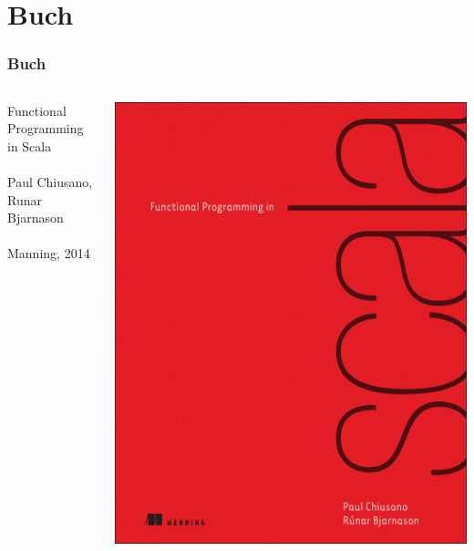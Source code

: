 	\section[Buch]{Buch}
		\begin{frame}[fragile]
		\frametitle{Buch}
	    
\begin{columns}[c]
  \begin{column}{0.55\textwidth}
    Functional Programming in Scala\\
    \leavevmode \\
    Paul Chiusano,
    Runar Bjarnason\\
    \leavevmode \\
    Manning, 2014
  \end{column}
  \begin{column}[T]{0.55\textwidth}
    \includegraphics[scale=0.06]{book2.jpg}
  \end{column}
\end{columns}
		
		
\end{frame}